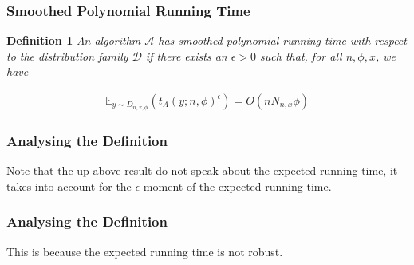 \begin{frame}
    \frametitle{Smoothed Polynomial Running Time}

    \textbf{Definition 1} \textit{An algorithm $\mathcal{A}$ has smoothed polynomial
    running time with respect to the distribution family $\mathcal{D}$
    if there exists an $\epsilon > 0$ such that, for all $n, \phi, x$, we have}

    \begin{align*}
        \mathbb{E}_{y \sim D_{n, x, \phi}} \left(t_A(y; n, \phi) ^{\epsilon}\right) = O(nN_{n,x}\phi)
    \end{align*}
\end{frame}

\begin{frame}
    \frametitle{Analysing the Definition}
    
    \begin{center}
        Note that the up-above result do not speak about the expected running time, it takes
        into account for the $\epsilon$ moment of the expected running time.
    \end{center}
\end{frame}

\begin{frame}
    \frametitle{Analysing the Definition}
    
    \begin{center}
        This is because the expected running time is not robust.
    \end{center}
\end{frame}